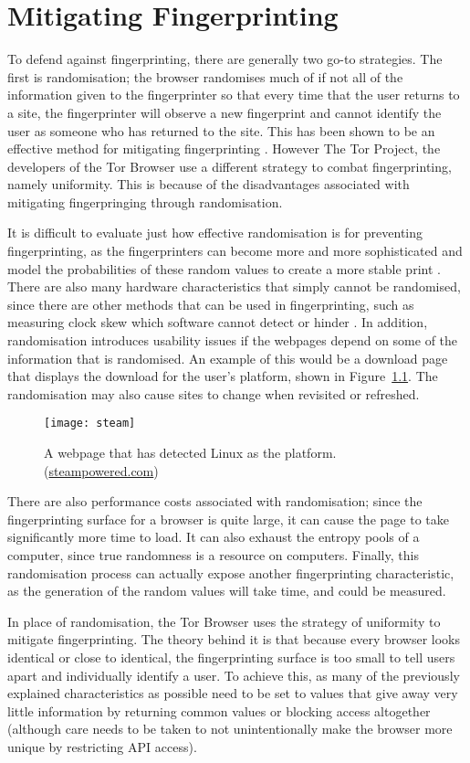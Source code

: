 \chapter{Mitigating Fingerprinting}

To defend against fingerprinting, there are generally two go-to strategies.
The first is randomisation; the browser randomises much of if not all of the information given to the fingerprinter so that every time that the user returns to a site, the fingerprinter will observe a new fingerprint and cannot identify the user as someone who has returned to the site.
This has been shown to be an effective method for mitigating fingerprinting \citep{privaricator}.
However The Tor Project, the developers of the Tor Browser use a different strategy to combat fingerprinting, namely uniformity.
This is because of the disadvantages associated with mitigating fingerpringing through randomisation.

It is difficult to evaluate just how effective randomisation is for preventing fingerprinting, as the fingerprinters can become more and more sophisticated and model the probabilities of these random values to create a more stable print \citep{tor-project}.
There are also many hardware characteristics that simply cannot be randomised, since there are other methods that can be used in fingerprinting, such as measuring clock skew which software cannot detect or hinder \citep{skew}.
In addition, randomisation introduces usability issues if the webpages depend on some of the information that is randomised.
An example of this would be a download page that displays the download for the user's platform, shown in Figure~\ref{fig:steam}.
The randomisation may also cause sites to change when revisited or refreshed.

\begin{figure}[h]
\texttt{[image: steam]}
\centering
\caption{A webpage that has detected Linux as the platform. (\url{steampowered.com})}
\label{fig:steam}
\end{figure}

There are also performance costs associated with randomisation; since the fingerprinting surface for a browser is quite large, it can cause the page to take significantly more time to load.
It can also exhaust the entropy pools of a computer, since true randomness is a resource on computers.
Finally, this randomisation process can actually expose another fingerprinting characteristic, as the generation of the random values will take time, and could be measured.

In place of randomisation, the Tor Browser uses the strategy of uniformity to mitigate fingerprinting.
The theory behind it is that because every browser looks identical or close to identical, the fingerprinting surface is too small to tell users apart and individually identify a user.
To achieve this, as many of the previously explained characteristics as possible need to be set to values that give away very little information by returning common values or blocking access altogether (although care needs to be taken to not unintentionally make the browser more unique by restricting API access).


